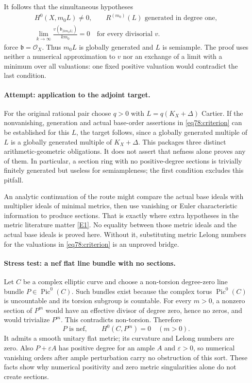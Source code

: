 \documentclass[11pt,a4paper]{article}
\numberwithin{equation}{section}
\newcommand{\eref}[2]{\hyperlink{extra:#1:#2}{[E#2]}}
\begin{document}
It follows that the simultaneous hypotheses
\begin{equation}\label{eq78:criterion}
 \begin{gathered}
 H^0(X,m_0L)\ne0,\qquad R^{(m_0)}(L)\text{ generated in degree one},\\
 \lim_{k\to\infty}\frac{v(\mathfrak b_{|km_0L|})}{km_0}=0
       \quad\text{for every divisorial }v.
 \end{gathered}
\end{equation}
force $\mathfrak b=\mathcal O_X$. Thus $m_0L$ is globally generated and
$L$ is semiample. The proof uses neither a numerical approximation to
$v$ nor an exchange of a limit with a minimum over all valuations: one
fixed positive valuation would contradict the last condition.

\paragraph{Attempt: application to the adjoint target.}
For the original rational pair choose $q>0$ with
$L=q(K_X+\Delta)$ Cartier. If the nonvanishing, generation and actual
base-order assertions in \eqref{eq78:criterion} can be established for
this $L$, the target follows, since a globally generated multiple of $L$
is a globally generated multiple of $K_X+\Delta$.
This packages three distinct arithmetic-geometric obligations. It does
not assert that nefness alone proves any of them. In particular, a section
ring with no positive-degree sections is trivially finitely generated but
useless for semiampleness; the first condition excludes this pitfall.

An analytic continuation of the route might compare the actual base ideals
with multiplier ideals of minimal metrics, then use vanishing or Euler
characteristic information to produce sections. That is exactly where
extra hypotheses in the metric literature matter \eref{statement}{1}.
No equality between those metric ideals and the actual base ideals is
proved here. Without it, substituting metric Lelong numbers for the
valuations in \eqref{eq78:criterion} is an unproved bridge.

\paragraph{Stress test: a nef flat line bundle with no sections.}
Let $C$ be a complex elliptic curve and choose a non-torsion degree-zero
line bundle $P\in\operatorname{Pic}^0(C)$. Such bundles exist because the
complex torus $\operatorname{Pic}^0(C)$ is uncountable and its torsion
subgroup is countable. For every $m>0$, a nonzero section of $P^m$ would
have an effective divisor of degree zero, hence no zeros, and would
trivialize $P^m$. This contradicts non-torsion. Therefore
\[
 P\text{ is nef},\qquad H^0(C,P^m)=0\quad(m>0).
\]
It admits a smooth unitary flat metric; its curvature and Lelong numbers
are zero. Also $P+\varepsilon A$ has positive degree for an ample $A$
and $\varepsilon>0$, so numerical vanishing orders after ample perturbation
carry no obstruction of this sort. These facts show why numerical
positivity and zero metric singularities alone do not create sections.
\end{document}
